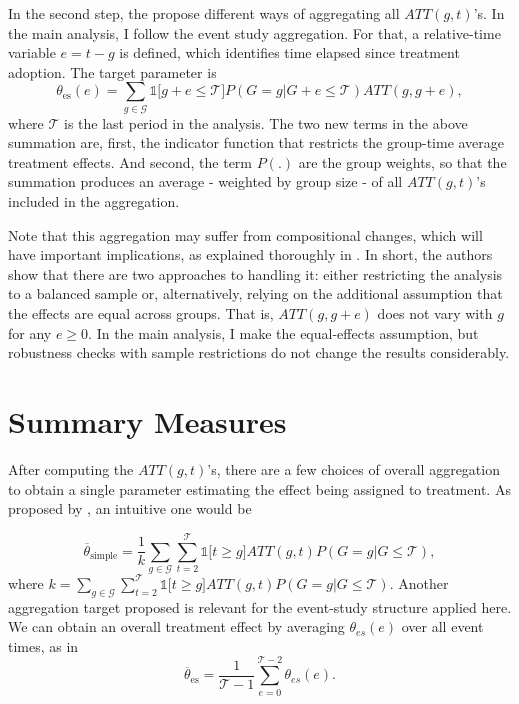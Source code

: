 In the second step, the \textcite{cs2021did_mtp} propose different ways of aggregating all $ATT(g,t)$'s.
In the main analysis, I follow the event study aggregation. For that, a relative-time 
variable $e = t-g$ is defined, which identifies time elapsed since treatment adoption. The target 
parameter is
%
\begin{equation}
    \theta_\text{es}(e) = \sum_{g \in \mathcal{G}} \mathbb{1}\big[ g + e \leq \mathcal{T} \big] P(G=g|G+e \leq \mathcal{T}) ATT(g,g+e), 
    \label{eq:theta_es}
\end{equation}
%
where $\mathcal{T}$ is the last period in the analysis. The two new terms in the above summation are, first,
the indicator function that restricts the group-time average treatment effects. And second, the term $P(.)$ are
the group weights, so that the summation produces an average - weighted by group size - of all $ATT(g,t)$'s
included in the aggregation.


Note that this aggregation may suffer from compositional changes, which will have important implications, as
explained thoroughly in \textcite[see Equation 3.5]{cs2021did_mtp}. In short, the authors show that there are
two approaches to handling it: either restricting the analysis to a balanced sample or, alternatively, relying
on the additional assumption that the effects are equal across groups. That is, $ATT(g,g+e)$ does not vary with
$g$ for any $e \geq 0$. In the main analysis, I make the equal-effects assumption, but robustness checks with
sample restrictions do not change the results considerably.

\section{Summary Measures}

After computing the $ATT(g,t)$'s, there are a few choices of overall aggregation to obtain a single
parameter estimating the effect being assigned to treatment. As proposed by \textcite[Section
3.2]{cs2021did_mtp}, an intuitive one would be

\begin{equation}
    \overbar{\theta}_\text{simple} = \frac{1}{k} \sum_{g \in \mathcal{G}}^{} 
    \sum_{t=2}^{\mathcal{T}} \mathbb{1}\big[ t \geq g \big] ATT(g,t) P(G=g|G \leq \mathcal{T}), 
    \label{eq:didsimp}
\end{equation}
%
where $k=\sum_{g \in \mathcal{G}} \sum_{t=2}^{\mathcal{T}} \mathbb{1}\big[ t \geq g \big]
ATT(g,t) P(G=g|G \leq \mathcal{T})$. Another aggregation target proposed is relevant for the
event-study structure applied here. We can obtain an overall treatment effect by averaging
$\theta_{es}(e)$ over all event times, as in%
%
\begin{equation}
    \overbar{\theta}_\text{es} = \frac{1}{\mathcal{T-1}} \sum_{e=0}^{\mathcal{T}-2}{\theta_{es}(e)}.
    \label{eq:didpostpast}
\end{equation}

